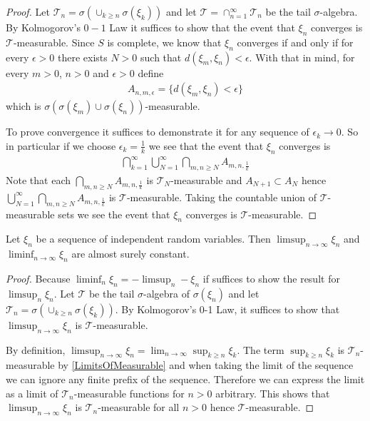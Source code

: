 \begin{proof}
Let $\mathcal{T}_n = \sigma\left( \cup_{k\geq n} \sigma(\xi_k)
\right)$ and let $\mathcal{T} = \cap_{n=1}^\infty \mathcal{T}_n $ be
the tail $\sigma$-algebra.  By Kolmogorov's $0-1$ Law it suffices to show that the event that
$\xi_n$ converges is $\mathcal{T}$-measurable. 
Since $S$ is complete, we know that $\xi_n$ converges if and only if
for every $\epsilon > 0$ there exists $N>0$ such that $d(\xi_m, \xi_n)
< \epsilon$.  With that in mind, for every $m>0$, $n>0$ and $\epsilon>0$ define
\begin{align*}
A_{n,m,\epsilon} = \lbrace d(\xi_m, \xi_n) < \epsilon \rbrace
\end{align*}
which is $\sigma \left(\sigma(\xi_m) \cup \sigma(\xi_n)
\right)$-measurable.

To prove convergence it suffices to demonstrate it for any sequence of
$\epsilon_k \to 0$.  So in particular if we choose $\epsilon_k =
\frac{1}{k}$ we see that the event that $\xi_n$ converges is
\begin{align*}
\bigcap_{k=1}^\infty \bigcup_{N=1}^\infty \bigcap_{m,n\geq N} A_{m,n,\frac{1}{k}}
\end{align*}
Note that each $\bigcap_{m,n\geq N} A_{m,n,\frac{1}{k}}$ is
$\mathcal{T}_N$-measurable and $A_{N+1} \subset A_N$ hence
$\bigcup_{N=1}^\infty \bigcap_{m,n\geq N} A_{m,n,\frac{1}{k}}$ is
$\mathcal{T}$-measurable.  Taking the countable union of
$\mathcal{T}$-measurable  sets we see the event that $\xi_n$ converges
is $\mathcal{T}$-measurable.  
\end{proof}

\begin{cor}\label{ConstantLimitOfIndependent}Let $\xi_n$ be a sequence of independent random variables.
  Then $\limsup_{n \to \infty} \xi_n$ and $\liminf_{n \to \infty} \xi_n$ are almost surely constant.
\end{cor}
\begin{proof}Because $\liminf_n \xi_n= -\limsup_n -\xi_n$ if suffices to
  show the result for $\limsup_n \xi_n$.   Let $\mathcal{T}$ be the tail $\sigma$-algebra of
  $\sigma(\xi_n)$ and let $\mathcal{T}_n = \sigma\left(\cup_{k\geq n}
  \sigma(\xi_k) \right)$.  By Kolmogorov's 0-1 Law, it suffices to show that $\limsup_{n \to \infty}
  \xi_n$ is $\mathcal{T}$-measurable.

By definition, $\limsup_{n \to \infty} \xi_n = \lim_{n \to \infty}
\sup_{k \geq n} \xi_k$.  The term $\sup_{k \geq n} \xi_k$ is
$\mathcal{T}_n$-measurable by \ref{LimitsOfMeasurable} and when taking the limit of the sequence
we can ignore any finite prefix of the sequence.  Therefore we can
express the limit as a limit of $\mathcal{T}_n$-measurable functions
for $n>0$ arbitrary.  This shows that $\limsup_{n \to \infty} \xi_n$
is $\mathcal{T}_n$-measurable for all $n>0$ hence $\mathcal{T}$-measurable.
\end{proof}

